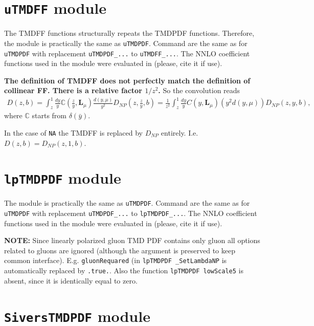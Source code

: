 \documentclass[prd,nofootinbib,eqsecnum,final]{revtex4}
\renewcommand{\(}{\left(}
\renewcommand{\)}{\right)}
\renewcommand{\[}{\left[}
\renewcommand{\]}{\right]}
\begin{document}
\newpage

\section{\texttt{uTMDFF} module}
\label{uTMDFF}

The TMDFF functions structurally repeats the TMDPDF functions. Therefore, the module is practically the same as \texttt{uTMDPDF}. Command are the same as for \texttt{uTMDPDF} with replacement \texttt{uTMDPDF\_...} to \texttt{uTMDFF\_...}. The NNLO coefficient functions used in the module were evaluated in \cite{Echevarria:2016scs,Echevarria:2015usa} (please, cite it if use).

\textbf{The definition of TMDFF does not perfectly match the definition of collinear FF. There is a relative factor $1/z^2$.} So the convolution reads
\begin{eqnarray}
D(z,b)=\int_z^1 \frac{dy}{y}\mathbb{C}\(\frac{z}{y},\mathbf{L}_\mu\)\frac{d(y,\mu)}{y^2}D_{NP}(z,\frac{z}{y},b)=
\frac{1}{z^2}\int_z^1 \frac{dy}{y}C\(y,\mathbf{L}_\mu\)(y^2d(y,\mu))D_{NP}(z,y,b),
\end{eqnarray}
where $\mathbb{C}$ starts from $\delta(\bar y)$.

In the case of \texttt{NA} the TMDFF is replaced by $D_{NP}$ entirely. I.e. $D(z,b)=D_{NP}(z,1,b)$.

\section{\texttt{lpTMDPDF} module}
\label{lpTMDPDF}

The module is practically the same as \texttt{uTMDPDF}. Command are the same as for \texttt{uTMDPDF} with replacement \texttt{uTMDPDF\_...} to \texttt{lpTMDPDF\_...}. The NNLO coefficient functions used in the module were evaluated in \cite{Gutierrez-Reyes:2019rug} (please, cite it if use).

\begin{tcolorbox}
\textbf{NOTE:} Since linearly polarized gluon TMD PDF contains only gluon all options related to gluons are ignored (although the argument is preserved to keep common interface). E.g. \texttt{gluonRequared} (in \texttt{lpTMDPDF \_SetLambdaNP} is automatically replaced by \texttt{.true.}. Also the function \texttt{lpTMDPDF lowScale5} is absent, since it is identically equal to zero.
\end{tcolorbox}

\section{\texttt{SiversTMDPDF} module}
\label{lpTMDPDF}
\end{document}
